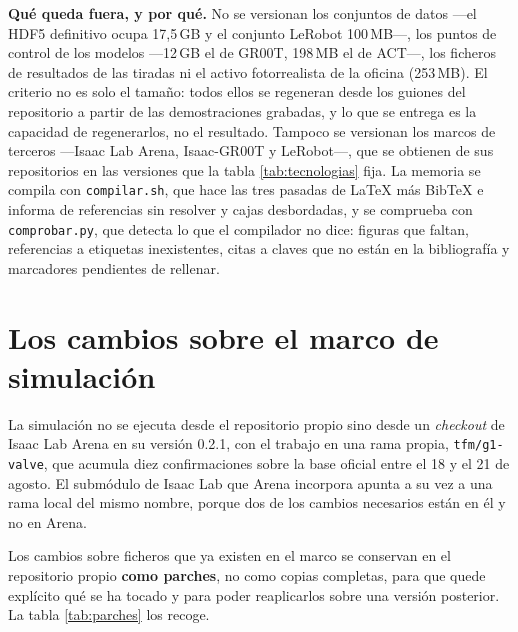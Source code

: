 \textbf{Qué queda fuera, y por qué.} No se versionan los conjuntos de datos —el HDF5 definitivo
ocupa 17,5\,GB y el conjunto LeRobot 100\,MB—, los puntos de control de los modelos —12\,GB el de
GR00T, 198\,MB el de ACT—, los ficheros de resultados de las tiradas ni el activo fotorrealista de
la oficina (253\,MB). El criterio no es solo el tamaño: todos ellos se regeneran desde los guiones
del repositorio a partir de las demostraciones grabadas, y lo que se entrega es la capacidad de
regenerarlos, no el resultado. Tampoco se versionan los marcos de terceros —Isaac Lab Arena,
Isaac-GR00T y LeRobot—, que se obtienen de sus repositorios en las versiones que la tabla
\ref{tab:tecnologias} fija. La memoria se compila con \texttt{compilar.sh}, que hace las tres
pasadas de \LaTeX{} más BibTeX e informa de referencias sin resolver y cajas desbordadas, y se
comprueba con \texttt{comprobar.py}, que detecta lo que el compilador no dice: figuras que faltan,
referencias a etiquetas inexistentes, citas a claves que no están en la bibliografía y marcadores
pendientes de rellenar.

\section{Los cambios sobre el marco de simulación}

La simulación no se ejecuta desde el repositorio propio sino desde un \textit{checkout} de Isaac
Lab Arena en su versión 0.2.1, con el trabajo en una rama propia, \texttt{tfm/g1-valve}, que
acumula diez confirmaciones sobre la base oficial entre el 18 y el 21 de agosto. El submódulo de
Isaac Lab que Arena incorpora apunta a su vez a una rama local del mismo nombre, porque dos de los
cambios necesarios están en él y no en Arena.

Los cambios sobre ficheros que ya existen en el marco se conservan en el repositorio propio
\textbf{como parches}, no como copias completas, para que quede explícito qué se ha tocado y para
poder reaplicarlos sobre una versión posterior. La tabla \ref{tab:parches} los recoge.

